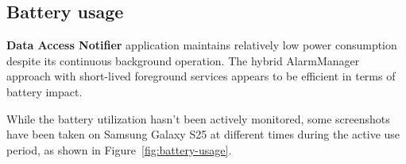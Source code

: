 \subsection{Battery usage}
\textbf{Data Access Notifier} application maintains relatively low power consumption despite its continuous background operation. The hybrid AlarmManager approach with short-lived foreground services appears to be efficient in terms of battery impact.

While the battery utilization hasn't been actively monitored, some screenshots have been taken on Samsung Galaxy S25 at different times during the active use period, as shown in Figure~\ref{fig:battery-usage}.

\begin{figure}[H]
\centering
\begin{minipage}{0.32\textwidth}
    \centering

\end{minipage}
\end{figure}
